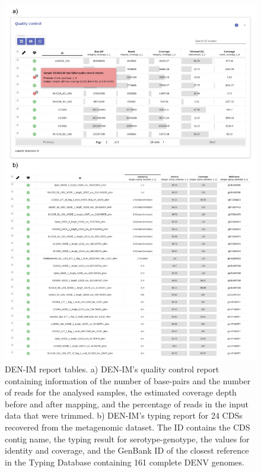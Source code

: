 \begin{figure}[h!]
\centering
\includegraphics[width=\textwidth]{figures/chapter 4/Figure S1.pdf}
\caption{DEN-IM report tables. a) DEN-IM's quality control report containing information of the number of base-pairs and the number of reads for the analysed samples, the estimated coverage depth before and after mapping, and the percentage of reads in the input data that were trimmed. b) DEN-IM's typing report for 24 CDSs recovered from the metagenomic dataset. The ID contains the CDS contig name, the typing result for serotype-genotype, the values for identity and coverage, and the GenBank ID of the closest reference in the Typing Database containing 161 complete DENV genomes.}
\label{fig:chap4_figure_sup1}
\end{figure}